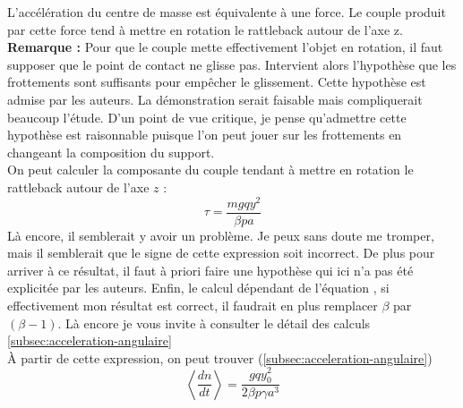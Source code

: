 \documentclass[12pt,a4paper]{article}
\makeatletter
\renewcommand*{\eqref}[1]{%
	\hyperref[{#1}]{\textup{\tagform@{\ref*{#1}}}}%
}
\makeatother
\begin{document}
	L'accélération du centre de masse est équivalente à une force.
	Le couple produit par cette force tend à mettre en rotation le rattleback autour de l'axe z.\\
	
	\textbf{Remarque : }Pour que le couple mette effectivement l'objet en rotation, il faut supposer que le point de contact ne glisse pas. Intervient alors l'hypothèse que les frottements sont suffisants pour empêcher le glissement. Cette hypothèse est admise par les auteurs. La démonstration serait faisable mais compliquerait beaucoup l'étude. D'un point de vue critique, je pense qu'admettre cette hypothèse est raisonnable puisque l'on peut jouer sur les frottements en changeant la composition du support.
	\\
	

	On peut calculer la composante du couple tendant à mettre en rotation le rattleback autour de l'axe $z$ :
	$$\tau=\dfrac{mgqy^2}{\beta p a}$$
 	Là encore, il semblerait y avoir un problème. Je peux sans doute me tromper, mais il semblerait que le signe de cette expression soit incorrect. De plus pour arriver à ce résultat, il faut à priori faire une hypothèse qui ici n'a pas été explicitée par les auteurs. Enfin, le calcul dépendant de l'équation \eqref{eq:acc-cm}, si effectivement mon résultat est correct, il faudrait en plus remplacer $\beta$ par $(\beta-1)$. Là encore je vous invite à consulter le détail des calculs \autoref{subsec:acceleration-angulaire}\\
	À partir de cette expression, on peut trouver (\ref{subsec:acceleration-angulaire})
	\begin{equation}
	\label{eq:moyenne-rot}
		\left<\dfrac{dn}{dt}\right>=\dfrac{gqy_0^2}{2\beta p\gamma a^3}
	\end{equation}
	
\end{document}
